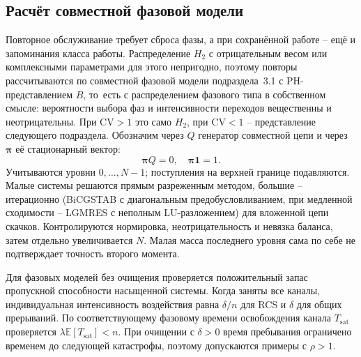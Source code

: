 \subsection{Расчёт совместной фазовой модели}
Повторное обслуживание требует сброса фазы, а при сохранённой работе -- ещё и запоминания класса работы. Распределение \(H_2\) с отрицательным весом или комплексными параметрами для этого непригодно, поэтому повторы рассчитываются по совместной фазовой модели подраздела~3.1 с PH-представлением \(B\), то~есть с распределением фазового типа в собственном смысле: вероятности выбора фаз и интенсивности переходов вещественны и неотрицательны. При \(\mathrm{CV}>1\) это само \(H_2\), при \(\mathrm{CV}<1\) -- представление следующего подраздела. Обозначим через \(Q\) генератор совместной цепи и через \(\boldsymbol\pi\) её стационарный вектор:
\[
\boldsymbol\pi Q=0,\quad \boldsymbol\pi\mathbf1=1.
\]
Учитываются уровни \(0,\ldots,N-1\); поступления на верхней границе подавляются. Малые системы решаются прямым разреженным методом, большие -- итерационно (BiCGSTAB с диагональным предобусловливанием, при медленной сходимости -- LGMRES с неполным LU-разложением) для вложенной цепи скачков. Контролируются нормировка, неотрицательность и невязка баланса, затем отдельно увеличивается \(N\). Малая масса последнего уровня сама по себе не подтверждает точность второго момента.

Для фазовых моделей без очищения проверяется положительный запас пропускной способности насыщенной системы. Когда заняты все каналы, индивидуальная интенсивность воздействия равна \(\delta/n\) для RCS и \(\delta\) для общих прерываний. По соответствующему фазовому времени освобождения канала \(T_{\mathrm{sat}}\) проверяется \(\lambda\mathbb E[T_{\mathrm{sat}}]<n\). При очищении с \(\delta>0\) время пребывания ограничено временем до следующей катастрофы, поэтому допускаются примеры с \(\rho>1\).

